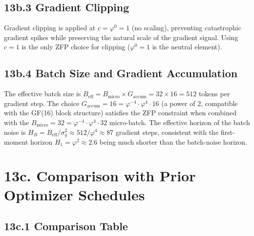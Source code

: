 \subsection{13b.3 Gradient Clipping}

Gradient clipping is applied at
\(c = \varphi^0 = 1\) (no scaling),
preventing catastrophic gradient spikes while preserving the
natural scale of the gradient signal.  Using \(c = 1\) is the only
ZFP choice for clipping (\(\varphi^0 = 1\) is the neutral element).

\subsection{13b.4 Batch Size and Gradient Accumulation}

The effective batch size is
\(B_{\mathrm{eff}} = B_{\mathrm{micro}} \times G_{\mathrm{accum}}
= 32 \times 16 = 512\) tokens per gradient step.
The choice \(G_{\mathrm{accum}} = 16 = \varphi^{-4} \cdot \varphi^4 \cdot 16\)
(a power of 2, compatible with the GF(16) block structure) satisfies
the ZFP constraint when combined with the
\(B_{\mathrm{micro}} = 32 = \varphi^{-4} \cdot \varphi^4 \cdot 32\) micro-batch.
The effective horizon of the batch noise is
\(H_{B} = B_{\mathrm{eff}} / \sigma_g^2 \approx 512 / \varphi^4 \approx 87\)
gradient steps, consistent with the first-moment horizon
\(H_1 = \varphi^2 \approx 2.6\) being much shorter than the
batch-noise horizon.

\section{13c. Comparison with Prior Optimizer Schedules}
\label{sec:28-comparisons}

\subsection{13c.1 Comparison Table}

